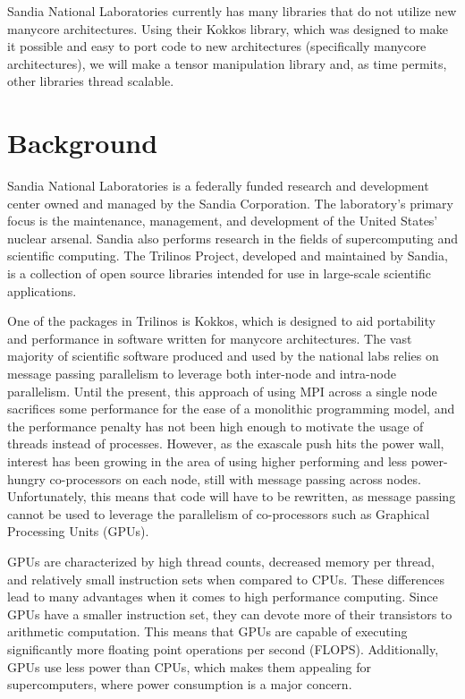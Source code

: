 \documentclass[proposal]{hmcclinic}
\begin{document}
Sandia National Laboratories currently has many libraries that do not utilize
new manycore architectures. Using their Kokkos library, which was designed to
make it possible and easy to port code to new architectures (specifically
manycore architectures), we will make a tensor manipulation library and, as
time permits, other libraries thread scalable.

\section{Background}

Sandia National Laboratories is a federally funded research and development
center owned and managed by the Sandia Corporation.  The laboratory's primary
focus is the maintenance, management, and development of the United States'
nuclear arsenal.  Sandia also performs research in the fields of supercomputing
and scientific computing.  The Trilinos Project, developed and maintained by
Sandia, is a collection of open source libraries intended for use in large-scale
scientific applications.

One of the packages in Trilinos is Kokkos, which is designed to aid portability
and performance in software written for manycore architectures.  The vast
majority of scientific software produced and used by the national labs relies on
message passing parallelism to leverage both inter-node and intra-node
parallelism.  Until the present, this approach of using MPI across a single node
sacrifices some performance for the ease of a monolithic programming model, and
the performance penalty has not been high enough to motivate the usage of
threads instead of processes.  However, as the exascale push hits the power
wall, interest has been growing in the area of using higher performing and less
power-hungry co-processors on each node, still with message passing across
nodes.  Unfortunately, this means that code will have to be rewritten, as
message passing cannot be used to leverage the parallelism of co-processors such
as Graphical Processing Units (GPUs).

GPUs are characterized by high thread counts, decreased memory per thread, and
relatively small instruction sets when compared to CPUs. These differences lead
to many advantages when it comes to high performance computing. Since GPUs have
a smaller instruction set, they can devote more of their transistors to
arithmetic computation. This means that GPUs are capable of executing
significantly more floating point operations per second (FLOPS). Additionally,
GPUs use less power than CPUs, which makes them appealing for supercomputers,
where power consumption is a major concern.
\end{document}
